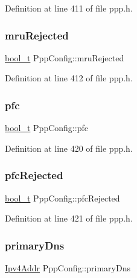 Definition at line 411 of file ppp.\+h.

\mbox{\label{structPppConfig_acf9af98e40ebbea526bed39eb5a76360}} 
\subsubsection{\texorpdfstring{mru\+Rejected}{mruRejected}}
{\footnotesize\ttfamily \hyperlink{compiler__port_8h_a812d16e5494522586b3784e55d479912}{bool\+\_\+t} Ppp\+Config\+::mru\+Rejected}



Definition at line 412 of file ppp.\+h.

\mbox{\label{structPppConfig_acfbd1b69c9b717719aaf259d13dec22c}} 
\subsubsection{\texorpdfstring{pfc}{pfc}}
{\footnotesize\ttfamily \hyperlink{compiler__port_8h_a812d16e5494522586b3784e55d479912}{bool\+\_\+t} Ppp\+Config\+::pfc}



Definition at line 420 of file ppp.\+h.

\mbox{\label{structPppConfig_ad0a3d11bc1ea16a96f5395594bedccfa}} 
\subsubsection{\texorpdfstring{pfc\+Rejected}{pfcRejected}}
{\footnotesize\ttfamily \hyperlink{compiler__port_8h_a812d16e5494522586b3784e55d479912}{bool\+\_\+t} Ppp\+Config\+::pfc\+Rejected}



Definition at line 421 of file ppp.\+h.

\mbox{\label{structPppConfig_ab4911101beaedfe7933f62a0562a2ea7}} 
\subsubsection{\texorpdfstring{primary\+Dns}{primaryDns}}
{\footnotesize\ttfamily \hyperlink{ipv4_8h_a411debb3d770caa0c06d3f73367da37f}{Ipv4\+Addr} Ppp\+Config\+::primary\+Dns}



